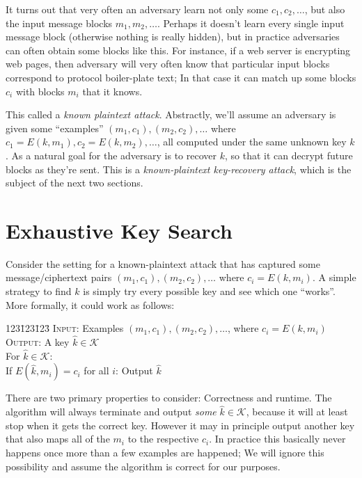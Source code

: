 \documentclass[11pt]{article}
\newcommand{\keys}{\mathcal{K}}
\begin{document}
It turns out that very often an adversary learn not only some $c_1,c_2,\ldots$,
but also the input message blocks $m_1,m_2,\ldots$. Perhaps it doesn't learn
every single input message block (otherwise nothing is really hidden), but
in practice adversaries can often obtain some blocks like this. For instance,
if a web server is encrypting web pages, then adversary will very often know
that particular input blocks correspond to protocol boiler-plate text; In
that case it can match up some blocks $c_i$ with blocks $m_i$ that it knows.

This called a \emph{known plaintext attack}. Abstractly, we'll assume an
adversary is given some ``examples'' $(m_1,c_1),(m_2,c_2),\ldots$ where
$c_1=E(k,m_1), c_2=E(k,m_2),\ldots$, all computed under the same unknown key
$k$. As a natural goal for the adversary is to recover $k$, so that it can
decrypt future blocks as they're sent. This is a \emph{known-plaintext
key-recovery attack}, which is the subject of the next two sections.

\section{Exhaustive Key Search}

Consider the setting for a known-plaintext attack that has captured some
message/ciphertext pairs $(m_1,c_1),(m_2,c_2),\ldots$ where $c_i=E(k,m_i)$. A
simple strategy to find $k$ is simply try every possible key and see which one
``works''. More formally, it could work as follows:

\begin{tabbing}123\=123\=123\=\kill
    \> \textsc{Input}: Examples $(m_1,c_1),(m_2,c_2),\ldots$, where $c_i=E(k,m_i)$\\
    \> \textsc{Output}: A key $\hat{k}\in\keys$\\
    \> For $\hat{k}\in\keys$:\\
    \> \> If $E(\hat{k},m_i)=c_i$ for all $i$: Output $\hat{k}$
\end{tabbing}

There are two primary properties to consider: Correctness and runtime. The
algorithm will always terminate and output \emph{some} $\hat{k}\in\keys$,
because it will at least stop when it gets the correct key. However it may in
principle output another key that also maps all of the $m_i$ to the respective
$c_i$. In practice this basically never happens once more than a few examples
are happened; We will ignore this possibility and assume the algorithm is
correct for our purposes.
\end{document}
